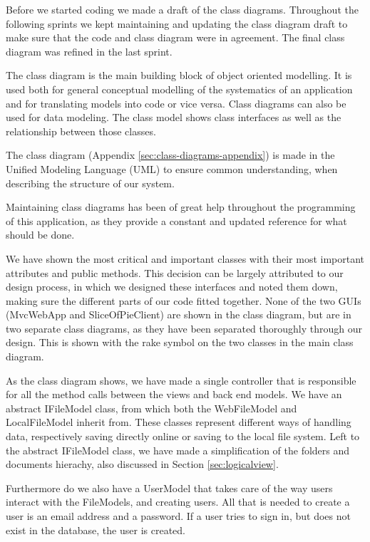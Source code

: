 Before we started coding we made a draft of the class diagrams. Throughout the following sprints we kept maintaining and updating the class diagram
draft to make sure that the code and class diagram were in agreement. The final class diagram was refined in the last sprint.

The class diagram is the main building block of object oriented modelling. It is used both for general conceptual modelling of the systematics 
of an application and for translating models into code or vice versa. Class diagrams can also be used for data modeling. The class model
shows class interfaces as well as the relationship between those classes.

The class diagram (Appendix \ref{sec:class-diagrams-appendix}) is made in the Unified Modeling Language (UML) to ensure common understanding, when describing the structure of our system.

Maintaining class diagrams has been of great help throughout the programming of this application, as they provide a constant and updated reference
for what should be done.

We have shown the most critical and important classes with their most important attributes and public methods. This decision can be largely attributed
to our design process, in which we designed these interfaces and noted them down, making sure the different parts of our code fitted together.
None of the two GUIs (MvcWebApp and SliceOfPieClient) are shown in the class diagram, but are in two separate class diagrams, as they have been separated
thoroughly through our design. This is shown with the rake symbol on the two classes in the main class diagram.

As the class diagram shows, we have made a single controller that is responsible for all the method calls between the views and back end models. We
have an abstract IFileModel class, from which both the WebFileModel and LocalFileModel inherit from. These classes represent different ways of handling
data, respectively saving directly online or saving to the local file system. Left to the abstract IFileModel class, we have
made a simplification of the folders and documents hierachy, also discussed in Section \ref{sec:logicalview}.

Furthermore do we also have a UserModel that takes care of the way users interact with the FileModels, and creating users. All that is needed
to create a user is an email address and a password. If a user tries to sign in, but does not exist in the database, the user is created.

